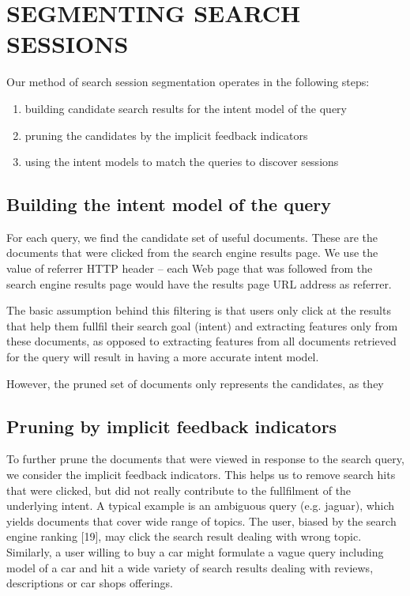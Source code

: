 \documentclass{acm_proc_article-sp} %
\begin{document}
\section{SEGMENTING SEARCH SESSIONS}

Our method of search session segmentation operates in the
following steps:

\begin{enumerate} 
	\item building candidate search results for the intent model
	of the query
	\item pruning the candidates by the implicit feedback indicators
	\item using the intent models to match the queries to discover
	sessions
\end{enumerate}

\subsection{Building the intent model of the query}

For each query, we find the candidate set of useful documents.
These are the documents that were clicked from the
search engine results page. We use the value of referrer
HTTP header – each Web page that was followed from the
search engine results page would have the results page URL
address as referrer.

The basic assumption behind this filtering is that users only
click at the results that help them fullfil their search goal (intent)
and extracting features only from these documents, as
opposed to extracting features from all documents retrieved
for the query will result in having a more accurate intent
model.

However, the pruned set of documents only represents the
candidates, as they

\subsection{Pruning by implicit feedback indicators}

To further prune the documents that were viewed in response
to the search query, we consider the implicit feedback
indicators. This helps us to remove search hits that
were clicked, but did not really contribute to the fullfilment
of the underlying intent. A typical example is an ambiguous
query (e.g. jaguar), which yields documents that cover
wide range of topics. The user, biased by the search engine
ranking [19], may click the search result dealing with wrong
topic. Similarly, a user willing to buy a car might formulate
a vague query including model of a car and hit a wide variety
of search results dealing with reviews, descriptions or
car shops offerings.
\end{document}
